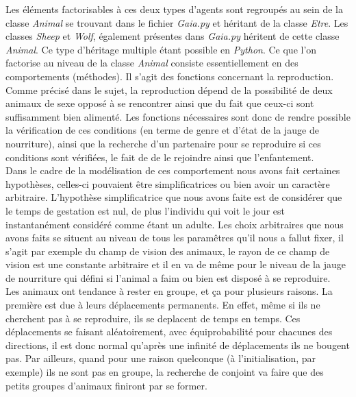 \documentclass[12pt]{article}
\begin{document}
Les éléments factorisables à ces deux types d'agents sont 
regroupés au sein de la classe \textit{Animal} se trouvant dans le fichier 
\textit{Gaia.py} et héritant de la classe \textit{Etre}. Les classes 
\textit{Sheep} et \textit{Wolf}, également présentes dans \textit{Gaia.py}
héritent de cette classe \textit{Animal}. Ce type d'héritage multiple étant 
possible en \textit{Python}. Ce que l'on factorise au niveau de la classe 
\textit{Animal} consiste essentiellement en des comportements (méthodes). Il 
s'agit des fonctions concernant la reproduction.\\

Comme précisé dans le sujet, la reproduction dépend de la possibilité de deux 
animaux de sexe opposé à se rencontrer ainsi que du fait que ceux-ci sont 
suffisamment bien alimenté. Les fonctions nécessaires sont donc de rendre 
possible la vérification de ces conditions (en terme de genre et d'état de la 
jauge de nourriture), ainsi que la recherche d'un partenaire pour se 
reproduire si ces conditions sont vérifiées, le fait de de le rejoindre ainsi 
que l'enfantement.\\

Dans le cadre de la modélisation de ces comportement nous avons fait certaines 
hypothèses, celles-ci pouvaient être simplificatrices ou bien avoir un 
caractère arbitraire. L'hypothèse simplificatrice que nous avons faite est de 
considérer que le temps de gestation est nul, de plus l'individu qui voit le 
jour est instantanément considéré comme étant un adulte. Les choix arbitraires 
que nous avons faits se situent au niveau de tous les paramêtres qu'il nous a 
fallut fixer, il s'agit par exemple du champ de vision des animaux, le rayon 
de ce champ de vision est une constante arbitraire et il en va de même pour 
le niveau de la jauge de nourriture qui défini si l'animal a faim ou bien est 
disposé à se reproduire.\\

Les animaux ont tendance à rester en groupe, et ça pour plusieurs raisons. La 
première est due à leurs déplacements permanents. En effet, même si ils ne 
cherchent pas à se reproduire, ils se deplacent de temps en temps. Ces 
déplacements se faisant aléatoirement, avec équiprobabilité pour chacunes des 
directions, il est donc normal qu'après une infinité de déplacements ils ne 
bougent pas. Par ailleurs, quand pour une raison quelconque (à l'initialisation, 
par exemple) ils ne sont pas en groupe, la recherche de conjoint va faire que 
des petits groupes d'animaux finiront par se former.\\
\end{document}
